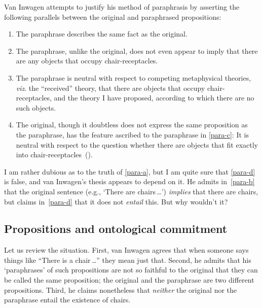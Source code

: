 \documentclass[11pt]{standalone}
\begin{document}
\begin{spacing}{1.5}
Van Inwagen attempts to justify his method of paraphrasis by asserting
the following parallels between the original and paraphrased
propositions:
\begin{enumerate}[label=(\Alph*)]
	\item The paraphrase describes the same fact as the
          original.  \label{para-a}
	\item The paraphrase, unlike the original, does not even
          appear to imply that there are any objects that occupy
          chair-receptacles.  \label{para-b}
	\item The paraphrase is neutral with respect to competing
          metaphysical theories, {\em viz}.  the ``received'' theory,
          that there are objects that occupy chair-receptacles, and
          the theory I have proposed, according to which there are no
          such objects.  \label{para-c}
	\item The original, though it doubtless does not express the
          same proposition as the paraphrase, has the feature ascribed
          to the paraphrase in \ref{para-c}: It is neutral with
          respect to the question whether there are objects that fit
          exactly into
          chair-receptacles~(\citeyear[113]{inwagen1995}).  \label{para-d}
\end{enumerate}
I am rather dubious as to the truth of \ref{para-a}, but I am quite
sure that \ref{para-d} is false, and van Inwagen's thesis appears to
depend on it.  He admits in~\ref{para-b} that the original sentence
(e.g., `There are chairs\,\ldots ') {\em implies} that there are
chairs, but claims in~\ref{para-d} that it does not {\em entail} this.
But why wouldn't it?

\subsection{Propositions and ontological commitment}
Let us review the situation.  First, van Inwagen agrees that when
someone says things like ``There is a chair\,\ldots '' they mean just
that.  Second, he admits that his `paraphrases' of such propositions
are not so faithful to the original that they can be called the same
proposition; the original and the paraphrase are two different
propositions.  Third, he claims nonetheless that {\em neither} the
original nor the paraphrase entail the existence of chairs.


\end{spacing}
\end{document}
